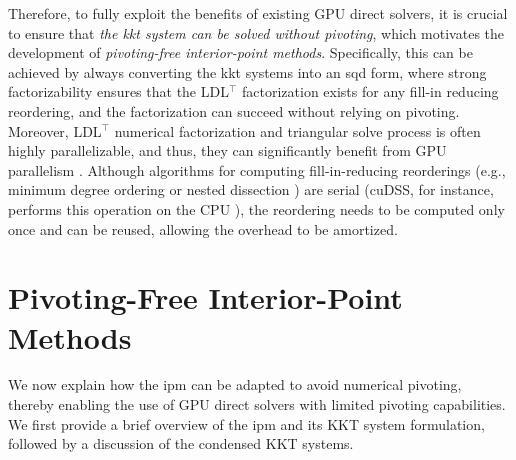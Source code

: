 \documentclass{article}
\begin{document}
Therefore, to fully exploit the benefits of existing GPU direct solvers, it is crucial to ensure that \emph{the \gls*{kkt} system can be solved without pivoting}, which motivates the development of \emph{pivoting-free interior-point methods}.
Specifically, this can be achieved by always converting the \gls*{kkt} systems into an \gls*{sqd} form, where strong factorizability ensures that the LDL$^\top$ factorization exists for any fill-in reducing reordering, and the factorization can succeed without relying on pivoting.
Moreover, LDL$^\top$ numerical factorization and triangular solve process is often highly parallelizable, and thus, they can significantly benefit from GPU parallelism \cite{naumovParallelSolutionSparse}. 
Although algorithms for computing fill-in-reducing reorderings (e.g., minimum degree ordering \cite{amestoyApproximateMinimumDegree1996} or nested dissection \cite{karypisMETISSoftwarePackage1997}) are serial (cuDSS, for instance, performs this operation on the CPU \cite{nvidiaNVIDIACuDSSPreview}), the reordering needs to be computed only once and can be reused, allowing the overhead to be amortized.


\section{Pivoting-Free Interior-Point Methods}\label{eqn:ipm}
We now explain how the \gls*{ipm} can be adapted to avoid numerical pivoting, thereby enabling the use of GPU direct solvers with limited pivoting capabilities. We first provide a brief overview of the \gls*{ipm} and its KKT system formulation, followed by a discussion of the condensed KKT systems.
\end{document}
